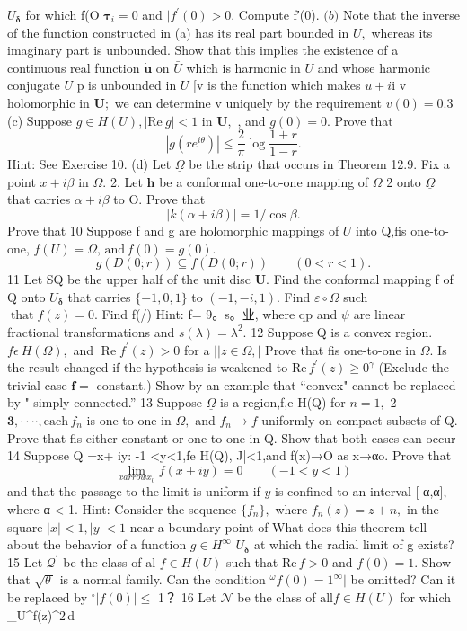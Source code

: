 $U_{\mathbf{\delta}}$ for which f(O $\mathbf{\tau}_{i}=0$ and $|f^{\prime}(0)>0.$ Compute f′(0). ${\mathfrak{(}}b{\mathfrak{)}}$ Note that the inverse of the function constructed in (a) has its real part bounded in $U,$ whereas its imaginary part is unbounded. Show that this implies the existence of a continuous real function $\dot{\boldsymbol{u}}$ on $\bar{U}$ which is harmonic in $\boldsymbol{\mathit{U}}$ and whose harmonic conjugate $\boldsymbol{\mathit{U}}$ p is unbounded in $\boldsymbol{\mathit{U}}$ [v is the function which makes $u+i\mathrm{i}$ v holomorphic in ${\boldsymbol{U}};$ we can determine v uniquely by the requirement $v(0)=0.3$ (c) Suppose $g\in H(U),\left|{\mathrm{Re~}}g\right|<1$ in ${\boldsymbol{U}},$ , and $g(0)=0.$ Prove that $$ |g(r e^{i\theta})|\leq\frac{2}{\pi}\log\frac{1+r}{1-r}. $$ Hint: See Exercise 10. (d) Let $\underline{{\Omega}}$ be the strip that occurs in Theorem 12.9. Fix a point $x+i\beta$ in $\Omega.$ 2. Let ${\boldsymbol{h}}$ be a conformal one-to-one mapping of $\Omega$ 2 onto $\underline{{\Omega}}$ that carries $\alpha+i\beta$ to O. Prove that $$ |k(\alpha+i\beta)|=1/\cos\beta. $$ Prove that 10 Suppose f and g are holomorphic mappings of $U$ into Q,fis one-to-one, $f(U)=\Omega,\,\mathrm{and}\,f(0)=g(0).$ $$ g(D(0;r))\subseteq f(D(0;r))\qquad(0<r<1). $$ 11 Let SQ be the upper half of the unit disc ${\boldsymbol{U}}.$ Find the conformal mapping f of Q onto $U_{\mathbf{\delta}}$ that carries $\{-1,0,1\}$ to $(-1,-i,1).$ Find $\scriptstyle{\varepsilon\circ\Omega}$ such $\operatorname{that}f(z)=0.$ Find f(/) Hint: f= 9。s。业, where qp and $\psi$ are linear fractional transformations and $s(\lambda)=\lambda^{2}.$ 12 Suppose Q is a convex region. $f\epsilon\ H(\Omega),$ and $\operatorname{Re}f^{\prime}(z)>0$ for a $||z\in\Omega,|$ Prove that fis one-to-one in $\Omega.$ Is the result changed if the hypothesis is weakened to $\mathrm{Re}\,f^{\prime}(z)\geq0^{\gamma}$ (Exclude the trivial case ${\boldsymbol{f}}=$ constant.) Show by an example that “convex" cannot be replaced by " simply connected.” 13 Suppose $\underline{{\Omega}}$ is a region,f,e H(Q) for $n=1,$ 2 $\mathbf{3},\mathbf{\boldsymbol{\cdot}}\cdot\cdot\cdot,\mathrm{each}\,f_{n}$ is one-to-one in $\Omega,$ and $f_{n}\to f$ uniformly on compact subsets of Q. Prove that fis either constant or one-to-one in Q. Show that both cases can occur 14 Suppose Q ={x+ iy: -1 <y<1},fe H(Q), J|<1,and f(x)→O as x→αo. Prove that $$ \operatorname*{lim}_{x arrow x_{0}}f(x+i y)=0\qquad(-1<y<1) $$ and that the passage to the limit is uniform if $\scriptstyle{y}$ is confined to an interval [-α,α], where α < 1. Hint: Consider the sequence $\{f_{n}\},$ where $f_{n}(z)=z+n,$ in the square $|x|<1,|y|<1$ near a boundary point of What does this theorem tell about the behavior of a function $g\in H^{\infty}$ $U_{\mathbf{\delta}}$ at which the radial limit of g exists? 15 Let ${\mathcal{Q}}^{\prime}$ be the class of al $f\in H(U)$ such that $\mathrm{Re}\,f>0$ and $f(0)=1.$ Show that $\mathcal{\sqrt{\theta\,}}$ is a normal family. Can the condition ${}^{\omega}f(0)=1^{\infty}|$ be omitted? Can it be replaced by ${}^{\circ}|f(0)|\leq$ 1？ 16 Let ${\mathcal{N}}$ be the class of ${\mathrm{all}}f\in H(U)$ for which $$ \vert\int_{U}^{}\vert f(z)\vert^{2}\,d 